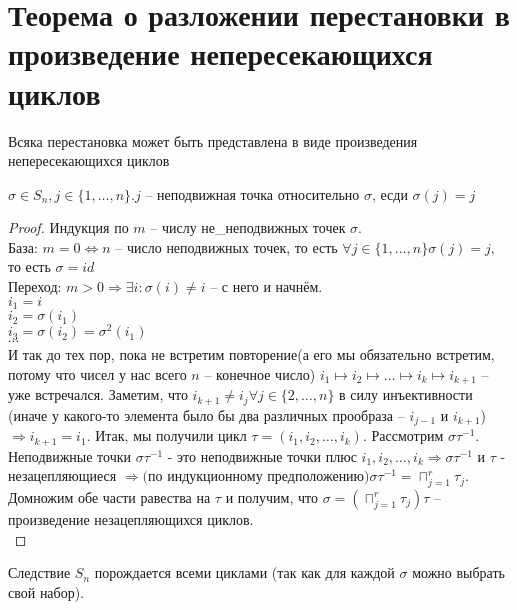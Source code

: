 \section{Теорема о разложении перестановки в произведение непересекающихся циклов}

\begin{theorem}{Всяка перестановка может быть представлена в виде произведения непересекающихся циклов}
\begin{Def}
	$\sigma \in S_n, j \in \{1, \dotsc, n\}. j$ -- неподвижная точка относительно $\sigma$, есди $\sigma(j) = j$
\end{Def}
\end{theorem}
\begin{proof}
	Индукция по $m$ -- числу не\_неподвижных точек $\sigma$.\\
База: $m = 0 \Leftrightarrow n $ -- число неподвижных точек, то есть $\forall j \in \{1, \dotsc, n\} \sigma(j) = j, $ то есть $\sigma = id$\\
Переход: $m > 0 \Rightarrow \exists i: \sigma(i) \ne i$ -- с него и начнём.\\
$i_1 = i$\\
$i_2 = \sigma(i_1)$\\
$i_3 = \sigma(i_2) = \sigma^2(i_1)$\\
$\dotsb$\\
И так до тех пор, пока не встретим повторение(а его мы обязательно встретим, потому что чисел у нас всего $n$ -- конечное число)
$i_1 \mapsto i_2 \mapsto \dotsc \mapsto i_k \mapsto i_{k+1}$ -- уже встречался. Заметим, что $i_{k+1} \ne i_j \forall j \in \{2, \dotsc, n\}$ в силу инъективности \sigma (иначе у какого-то элемента было бы два различных прообраза -- $i_{j-1}$ и $i_{k+1}$) $\Rightarrow i_{k+1} = i_1$.  Итак, мы получили цикл $\tau = (i_1, i_2, \dotsc, i_k)$. Рассмотрим $\sigma\tau^{-1}$. Неподвижные точки $\sigma\tau^{-1}$ - это неподвижные точки \sigma плюс $i_1, i_2, \dotsc, i_k \Rightarrow \sigma\tau^{-1}$ и $\tau$ - незацепляющиеся $\Rightarrow($по индукционному предположению$) \sigma\tau^{-1} = \sqcap_{j = 1}^r \tau_j$. Домножим обе части равества на $\tau$ и получим, что $\sigma = (\sqcap_{j = 1}^r \tau_j)\tau$ -- произведение незацепляющихся циклов.\\
\end{proof}
\begin{theorem}{Следствие}
$S_n$ порождается всеми циклами (так как для каждой $\sigma$ можно выбрать свой набор).
\end{theorem}

